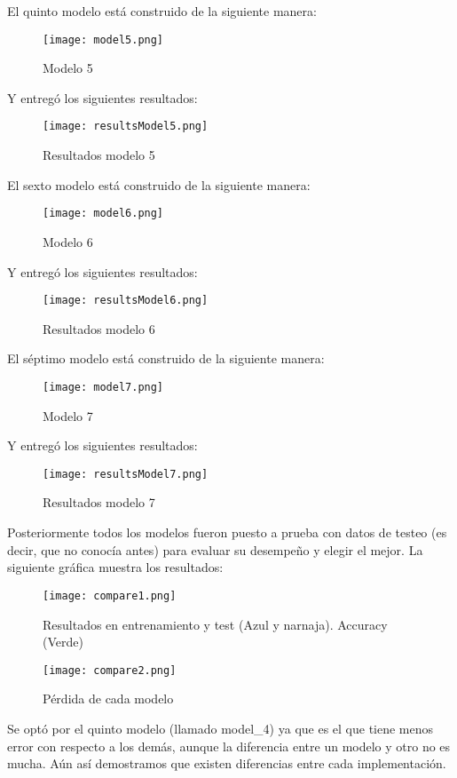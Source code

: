 \documentclass[journal]{IEEEtran}
\begin{document}
El quinto modelo está construido de la siguiente manera:
\begin{figure} [H]
    \centering
    \texttt{[image: model5.png]}
    \caption{Modelo 5}
    \label{17}
\end{figure}
Y entregó los siguientes resultados:
\begin{figure} [H]
    \centering
    \texttt{[image: resultsModel5.png]}
    \caption{Resultados modelo 5}
    \label{18}
\end{figure}
El sexto modelo está construido de la siguiente manera:
\begin{figure} [H]
    \centering
    \texttt{[image: model6.png]}
    \caption{Modelo 6}
    \label{19}
\end{figure}
Y entregó los siguientes resultados:
\begin{figure} [H]
    \centering
    \texttt{[image: resultsModel6.png]}
    \caption{Resultados modelo 6}
    \label{20}
\end{figure}
El séptimo modelo está construido de la siguiente manera:
\begin{figure} [H]
    \centering
    \texttt{[image: model7.png]}
    \caption{Modelo 7}
    \label{21}
\end{figure}
Y entregó los siguientes resultados:
\begin{figure} [H]
    \centering
    \texttt{[image: resultsModel7.png]}
    \caption{Resultados modelo 7}
    \label{22}
\end{figure}

Posteriormente todos los modelos fueron puesto a prueba con datos de testeo (es decir, que no conocía antes) para evaluar su desempeño y elegir el mejor. La siguiente gráfica muestra los resultados:
\begin{figure} [H]
    \centering
    \texttt{[image: compare1.png]}
    \caption{Resultados en entrenamiento y test (Azul y narnaja). Accuracy (Verde)}
    \label{23}
\end{figure}
\begin{figure} [H]
    \centering
    \texttt{[image: compare2.png]}
    \caption{Pérdida de cada modelo}
    \label{24}
\end{figure}
Se optó por el quinto modelo (llamado model\_4) ya que es el que tiene menos error con respecto a los demás, aunque la diferencia entre un modelo y otro no es mucha. Aún así demostramos que existen diferencias entre cada implementación.
\end{document}
